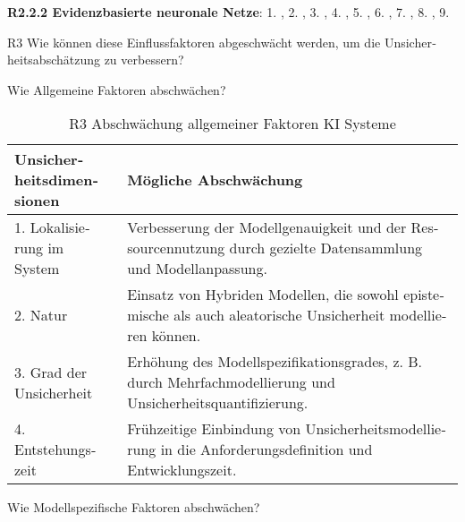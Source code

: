 \begin{otherlanguage}{ngerman}
{\begin{minipage}[t]{\textwidth}
\textbf{R2.2.2 Evidenzbasierte neuronale Netze}: 
1. \parencite{sensoy2018evidential},
2. \parencite[S.~2–3]{sensoy2018evidential},
3. \parencite[S.~4]{sensoy2018evidential},
4. \parencite[S.~5]{sensoy2018evidential},
5. \parencite[S.~6]{sensoy2018evidential},
6. \parencite[S.~6–7]{sensoy2018evidential},
7. \parencite{kendall2017uncertainties},
8. \parencite{kendall2017uncertainties},
9. \parencite[S.~6]{sensoy2018evidential}
\end{minipage}%
}


\newpage


R3 Wie können diese Einflussfaktoren abgeschwächt werden, um die Unsicherheitsabschätzung zu verbessern?

\newline
Wie Allgemeine Faktoren abschwächen?

\begin{table}[!htpb]
  \centering
  \footnotesize
  \begin{tabularx}{\textwidth}{|l|X|}
    \hline
    \textbf{Unsicherheitsdimensionen} & \textbf{Mögliche Abschwächung} \\
    \hline
    1. Lokalisierung im System & Verbesserung der Modellgenauigkeit und der Ressourcennutzung durch gezielte Datensammlung und Modellanpassung. \\
    \hline
    2. Natur & Einsatz von Hybriden Modellen, die sowohl epistemische als auch aleatorische Unsicherheit modellieren können. \\
    \hline
    3. Grad der Unsicherheit & Erhöhung des Modellspezifikationsgrades, z. B. durch Mehrfachmodellierung und Unsicherheitsquantifizierung. \\
    \hline
    4. Entstehungszeit & Frühzeitige Einbindung von Unsicherheitsmodellierung in die Anforderungsdefinition und Entwicklungszeit. \\
    \hline
  \end{tabularx}
  \caption{R3 Abschwächung allgemeiner Faktoren KI Systeme}\label{tab:chapter6r31}
\end{table}

\newline
Wie Modellspezifische Faktoren abschwächen?


\end{otherlanguage}
